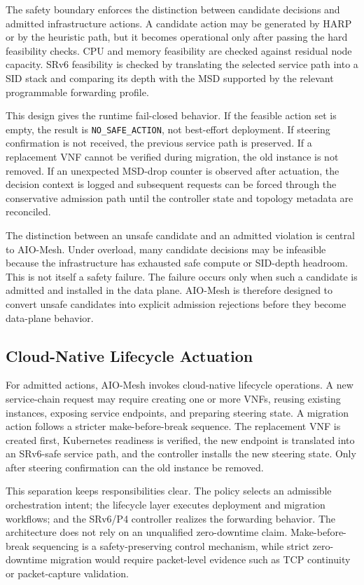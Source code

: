 \documentclass[final,5p]{elsarticle}
\begin{document}
The safety boundary enforces the distinction between candidate decisions and admitted infrastructure actions. A candidate action may be generated by HARP or by the heuristic path, but it becomes operational only after passing the hard feasibility checks. CPU and memory feasibility are checked against residual node capacity. SRv6 feasibility is checked by translating the selected service path into a SID stack and comparing its depth with the MSD supported by the relevant programmable forwarding profile.

This design gives the runtime fail-closed behavior. If the feasible action set is empty, the result is \texttt{NO\_SAFE\_ACTION}, not best-effort deployment. If steering confirmation is not received, the previous service path is preserved. If a replacement VNF cannot be verified during migration, the old instance is not removed. If an unexpected MSD-drop counter is observed after actuation, the decision context is logged and subsequent requests can be forced through the conservative admission path until the controller state and topology metadata are reconciled.

The distinction between an unsafe candidate and an admitted violation is central to AIO-Mesh. Under overload, many candidate decisions may be infeasible because the infrastructure has exhausted safe compute or SID-depth headroom. This is not itself a safety failure. The failure occurs only when such a candidate is admitted and installed in the data plane. AIO-Mesh is therefore designed to convert unsafe candidates into explicit admission rejections before they become data-plane behavior.

\subsection{Cloud-Native Lifecycle Actuation}
\label{subsec:cloud_native_actuation}

For admitted actions, AIO-Mesh invokes cloud-native lifecycle operations. A new service-chain request may require creating one or more VNFs, reusing existing instances, exposing service endpoints, and preparing steering state. A migration action follows a stricter make-before-break sequence. The replacement VNF is created first, Kubernetes readiness is verified, the new endpoint is translated into an SRv6-safe service path, and the controller installs the new steering state. Only after steering confirmation can the old instance be removed.

This separation keeps responsibilities clear. The policy selects an admissible orchestration intent; the lifecycle layer executes deployment and migration workflows; and the SRv6/P4 controller realizes the forwarding behavior. The architecture does not rely on an unqualified zero-downtime claim. Make-before-break sequencing is a safety-preserving control mechanism, while strict zero-downtime migration would require packet-level evidence such as TCP continuity or packet-capture validation.
\end{document}
